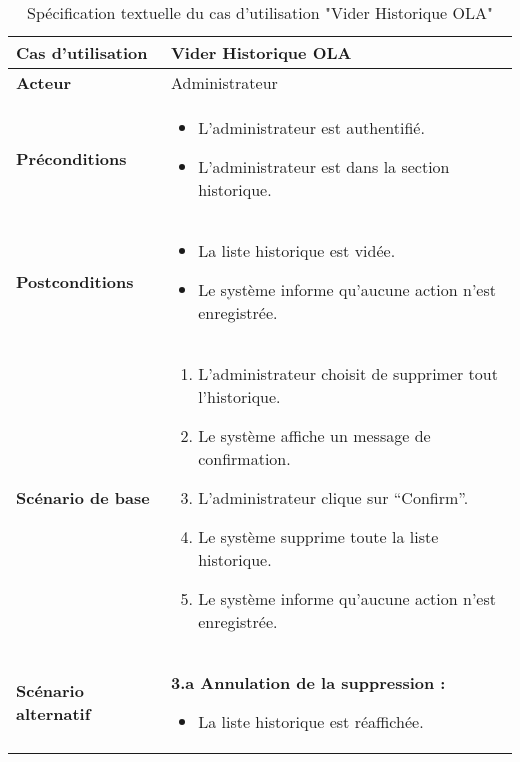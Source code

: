 \documentclass[a4paper,11pt]{report}
\begin{document}
\begin{table}[H]
  \centering
  \renewcommand{\arraystretch}{1.5}
  \caption{Spécification textuelle du cas d'utilisation "Vider Historique OLA"}
  \begin{tabularx}{\textwidth}{|l|X|}
    \hline
    \textbf{Cas d'utilisation} & Vider Historique OLA \\ \hline
    \textbf{Acteur}            & Administrateur \\ \hline
    \textbf{Préconditions}     & 
      \begin{itemize}
        \item L’administrateur est authentifié.
        \item L'administrateur est dans la section historique.
      \end{itemize} \\ \hline
    \textbf{Postconditions}    & 
      \begin{itemize}
        \item La liste historique est vidée.
        \item Le système informe qu’aucune action n’est enregistrée.
      \end{itemize} \\ \hline
    \textbf{Scénario de base}  & 
      \begin{enumerate}
        \item L’administrateur choisit de supprimer tout l’historique.
        \item Le système affiche un message de confirmation.
        \item L’administrateur clique sur “Confirm”.
        \item Le système supprime toute la liste historique.
        \item Le système informe qu’aucune action n’est enregistrée.
      \end{enumerate} \\ \hline
    \textbf{Scénario alternatif} & 
      \textbf{3.a Annulation de la suppression :}
      \begin{itemize}
        \item La liste historique est réaffichée.
      \end{itemize} \\ \hline
  \end{tabularx}
\end{table}
\end{document}
